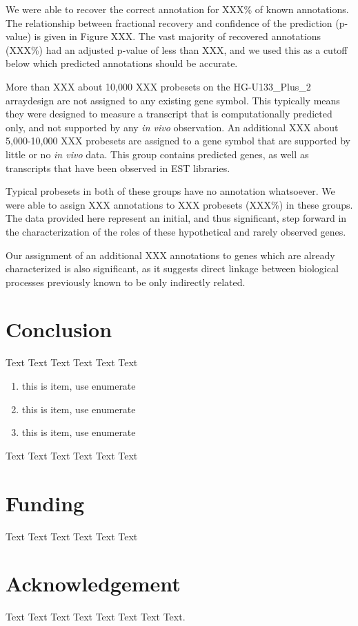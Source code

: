 \documentclass{bioinfo}
\begin{document}
We were able to recover the correct annotation for XXX\% of known annotations.
The relationship between fractional recovery and confidence of the prediction
(p-value) is given in Figure XXX.  The vast majority of recovered annotations
(XXX\%) had an adjusted p-value of less than XXX, and we used this as a cutoff
below which predicted annotations should be accurate.

More than XXX about 10,000 XXX probesets on the HG-U133\_Plus\_2 arraydesign are not
assigned to any existing gene symbol.  This typically means they were designed
to measure a transcript that is computationally predicted only, and not
supported by any \emph{in vivo} observation.  An additional XXX about
5,000-10,000 XXX probesets are assigned to a gene symbol that are supported by
little or no \emph{in vivo} data.  This group contains predicted genes, as well
as transcripts that have been observed in EST libraries.

Typical probesets in both of these groups have no annotation whatsoever.  We
were able to assign XXX annotations to XXX probesets (XXX\%) in these groups.
The data provided here represent an initial, and thus significant, step forward
in the characterization of the roles of these hypothetical and rarely observed
genes.

Our assignment of an additional XXX annotations to genes which are already
characterized is also significant, as it suggests direct linkage between
biological processes previously known to be only indirectly related.

\section{Conclusion}
Text Text Text Text Text Text

\begin{enumerate}
\item this is item, use enumerate 
\item this is item, use enumerate 
\item this is item, use enumerate 
\end{enumerate}

Text Text Text Text Text Text

\section*{Funding}
Text Text Text Text Text Text

\section*{Acknowledgement}
Text Text Text Text Text Text  Text Text.
\end{document}
